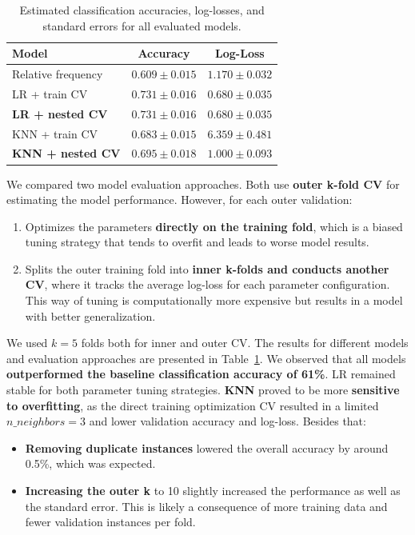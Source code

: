\documentclass[fleqn,moreauthors,10pt]{ds_report}
\begin{document}
\begin{table}[h!]
    \centering
    \begin{tabular}{l c c}
        \toprule
        \textbf{Model} & \textbf{Accuracy} & \textbf{Log-Loss} \\
        \midrule
        Relative frequency & $0.609 \pm 0.015$ & $1.170 \pm 0.032$ \\
        LR + train CV      & $0.731 \pm 0.016$ & $0.680 \pm 0.035$ \\
        \textbf{LR + nested CV}     & $\mathbf{0.731 \pm 0.016}$ & $\mathbf{0.680 \pm 0.035}$ \\
        KNN + train CV     & $0.683 \pm 0.015$ & $6.359 \pm 0.481$ \\
        \textbf{KNN + nested CV}    & $\mathbf{0.695 \pm 0.018}$ & $\mathbf{1.000 \pm 0.093}$ \\
        \bottomrule
    \end{tabular}
    \vspace{0.5em}
    \caption{Estimated classification accuracies, log-losses, and standard errors for all evaluated models.}
    \label{tab1}
\end{table}

We compared two model evaluation approaches. Both use \textbf{outer k-fold CV} for estimating the model performance. However, for each outer validation:

\begin{enumerate}
    \item Optimizes the parameters \textbf{directly on the training fold}, which is a biased tuning strategy that tends to overfit and leads to worse model results.
    \item Splits the outer training fold into \textbf{inner k-folds and conducts another CV}, where it tracks the average log-loss for each parameter configuration. This way of tuning is computationally more expensive but results in a model with better generalization.
\end{enumerate}

We used $k=5$ folds both for inner and outer CV. The results for different models and evaluation approaches are presented in Table~\ref{tab1}. We observed that all models \textbf{outperformed the baseline classification accuracy of 61\%}. LR remained stable for both parameter tuning strategies. \textbf{KNN} proved to be more \textbf{sensitive to overfitting}, as the direct training optimization CV resulted in a limited $n\_neighbors=3$ and lower validation accuracy and log-loss. Besides that:
\begin{itemize}
    \item \textbf{Removing duplicate instances} lowered the overall accuracy by around 0.5\%, which was expected.
    \item \textbf{Increasing the outer k} to 10 slightly increased the performance as well as the standard error. This is likely a consequence of more training data and fewer validation instances per fold.
\end{itemize}
\end{document}
